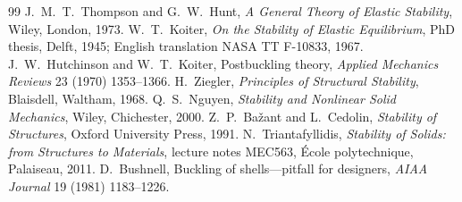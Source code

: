 \begin{chapterbib}{99}
 J.~M.~T.~Thompson and G.~W.~Hunt, \emph{A General Theory of Elastic Stability}, Wiley, London, 1973.
 W.~T.~Koiter, \emph{On the Stability of Elastic Equilibrium}, PhD thesis, Delft, 1945; English translation NASA TT F-10833, 1967.
 J.~W.~Hutchinson and W.~T.~Koiter, Postbuckling theory, \emph{Applied Mechanics Reviews} 23 (1970) 1353--1366.
 H.~Ziegler, \emph{Principles of Structural Stability}, Blaisdell, Waltham, 1968.
 Q.~S.~Nguyen, \emph{Stability and Nonlinear Solid Mechanics}, Wiley, Chichester, 2000.
 Z.~P.~Ba\v{z}ant and L.~Cedolin, \emph{Stability of Structures}, Oxford University Press, 1991.
 N.~Triantafyllidis, \emph{Stability of Solids: from Structures to Materials}, lecture notes MEC563, \'Ecole polytechnique, Palaiseau, 2011.
 D.~Bushnell, Buckling of shells---pitfall for designers, \emph{AIAA Journal} 19 (1981) 1183--1226.
\end{chapterbib}
